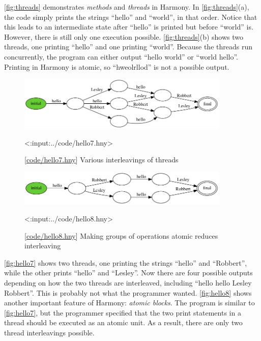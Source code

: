 \documentclass{report}
\newcommand{\harmonylink}[1]{%
[\href{https://harmony.cs.cornell.edu/#1}{\underline{#1}}]%
}
\newenvironment{code}{
\tcolorbox
}{
\endtcolorbox
}
\begin{document}
\autoref{fig:threads} demonstrates \emph{methods} and \emph{threads} in Harmony.
In \autoref{fig:threads}(a), the code simply prints the
strings ``hello'' and ``world'', in that order.
Notice that this leads to an intermediate
state after ``hello'' is printed but before ``world'' is.  However, there
is still only one execution possible. \autoref{fig:threads}(b) shows two
threads, one printing ``hello'' and one printing ``world''.  Because the
threads run concurrently, the program can either output ``hello world'' or
``world hello''.  Printing in Harmony is atomic, so ``hweolrllod'' is not
a possible  output.

\begin{figure}
\begin{center}
\includegraphics[width=0.9\textwidth]{figures/hello7.png}
\end{center}
\begin{code}
<{:input:../code/hello7.hny}>
\end{code}
\caption{\harmonylink{code/hello7.hny} Various interleavings of threads}
\label{fig:hello7}
\end{figure}

\begin{figure}
\begin{center}
\includegraphics[width=0.9\textwidth]{figures/hello8.png}
\end{center}
\begin{code}
<{:input:../code/hello8.hny}>
\end{code}
\caption{\harmonylink{code/hello8.hny} Making groups of operations atomic reduces interleaving}
\label{fig:hello8}
\end{figure}

\autoref{fig:hello7} shows two threads, one printing the strings
``hello'' and ``Robbert'', while the other prints ``hello'' and
``Lesley''.  Now there are four possible outputs depending on
how the two threads are interleaved, including
``hello hello Lesley Robbert''.  This is probably not what
the programmer wanted.  \autoref{fig:hello8} shows another
important feature of Harmony: \emph{atomic blocks}.  The
program is similar to \autoref{fig:hello7}, but the programmer
specified that the two print statements in a thread should
be executed as an atomic unit.  As a result, there are only
two thread interleavings possible.
\end{document}

